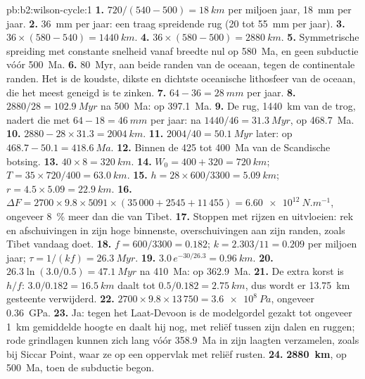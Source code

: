 \begin{solution}{pb:b2:wilson-cycle:1}
\textbf{1.} $720/(540 - 500) = \qty{18}{km}$ per miljoen jaar, \qty{18}{mm} per jaar.
\textbf{2.} \qty{36}{mm} per jaar: een traag spreidende rug (20 tot \qty{55}{mm} per jaar).
\textbf{3.} $36\times(580 - 540) = \qty{1440}{km}$.
\textbf{4.} $36\times(580 - 500) = \qty{2880}{km}$.
\textbf{5.} Symmetrische spreiding met constante snelheid vanaf breedte nul op \qty{580}{Ma}, en geen
subductie vóór \qty{500}{Ma}.
\textbf{6.} \qty{80}{Myr}, aan beide randen van de oceaan, tegen de continentale randen. Het is de
koudste, dikste en dichtste oceanische lithosfeer van de oceaan, die het meest geneigd is te zinken.
\textbf{7.} $64 - 36 = \qty{28}{mm}$ per jaar.
\textbf{8.} $2880/28 = \qty{102.9}{Myr}$ na \qty{500}{Ma}: op \qty{397.1}{Ma}.
\textbf{9.} De rug, \qty{1440}{km} van de trog, nadert die met $64 - 18 =
\qty{46}{mm}$ per jaar: na $1440/46 = \qty{31.3}{Myr}$, op \qty{468.7}{Ma}.
\textbf{10.} $2880 - 28\times31.3 = \qty{2004}{km}$.
\textbf{11.} $2004/40 = \qty{50.1}{Myr}$ later: op $468.7 - 50.1 = \qty{418.6}{Ma}$.
\textbf{12.} Binnen de 425 tot \qty{400}{Ma} van de Scandische botsing.
\textbf{13.} $40\times8 = \qty{320}{km}$.
\textbf{14.} $W_0 = 400 + 320 = \qty{720}{km}$; $T = 35\times720/400 = \qty{63.0}{km}$.
\textbf{15.} $h = 28\times600/3300 = \qty{5.09}{km}$; $r = 4.5\times5.09 = \qty{22.9}{km}$.
\textbf{16.} $\Delta F = 2700\times9.8\times5091\times(35\,000 + 2545 + 11\,455) =
\qty{6.60e12}{N.m^{-1}}$, ongeveer \qty{8}{\percent} meer dan die van Tibet.
\textbf{17.} Stoppen met rijzen en uitvloeien: rek en afschuivingen in zijn hoge binnenste,
overschuivingen aan zijn randen, zoals Tibet vandaag doet.
\textbf{18.} $f = 600/3300 = 0.182$; $k = 2.303/11 = 0.209$ per miljoen jaar; $\tau = 1/(kf)
= \qty{26.3}{Myr}$.
\textbf{19.} $3.0\,e^{-30/26.3} = \qty{0.96}{km}$.
\textbf{20.} $26.3\ln(3.0/0.5) = \qty{47.1}{Myr}$ na \qty{410}{Ma}: op \qty{362.9}{Ma}.
\textbf{21.} De extra korst is $h/f$: $3.0/0.182 = \qty{16.5}{km}$ daalt tot $0.5/0.182 =
\qty{2.75}{km}$, dus wordt er \qty{13.75}{km} gesteente verwijderd.
\textbf{22.} $2700\times9.8\times13\,750 = \qty{3.6e8}{Pa}$, ongeveer \qty{0.36}{GPa}.
\textbf{23.} Ja: tegen het Laat-Devoon is de modelgordel gezakt tot ongeveer \qty{1}{km} gemiddelde
hoogte en daalt hij nog, met reliëf tussen zijn dalen en ruggen; rode grindlagen kunnen zich
lang vóór \qty{358.9}{Ma} in zijn laagten verzamelen, zoals bij Siccar Point, waar ze op een oppervlak
met reliëf rusten.
\textbf{24.} \textbf{\qty[text-series-to-math=true]{2880}{km}}, op \qty{500}{Ma}, toen
de subductie begon.
\end{solution}
